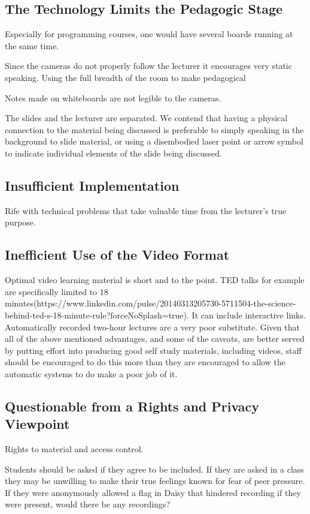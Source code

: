 \documentclass[a4paper,10pt]{article}
\begin{document}
\subsection{The Technology Limits the Pedagogic Stage}
Especially for programming courses, one would have several boards running at the same time.

Since the cameras do not properly follow the lecturer it encourages very static speaking. Using the full breadth of the room to make pedagogical 

Notes made on whiteboards are not legible to the cameras.

The slides and the lecturer are separated. We contend that having a physical connection to the material being discussed is preferable to simply speaking in the background to slide material, or using a disembodied laser point or arrow symbol to indicate individual elements of the slide being discussed. 

\subsection{Insufficient Implementation}
Rife with technical problems that take valuable time from the lecturer's true purpose. 

\subsection{Inefficient Use of the Video Format}
Optimal video learning material is short and to the point. TED talks for example are specifically limited to 18 minutes(https://www.linkedin.com/pulse/20140313205730-5711504-the-science-behind-ted-s-18-minute-rule?forceNoSplash=true). It can include interactive links. Automatically recorded two-hour lectures are a very poor substitute. Given that all of the above mentioned advantages, and some of the caveats, are better served by putting effort into producing good self study materials, including videos, staff should be encouraged to do this more than they are encouraged to allow the automatic systems to do make a poor job of it.

\subsection{Questionable from a Rights and Privacy Viewpoint}
Rights to material and access control.

Students should be asked if they agree to be included. If they are asked in a class they may be unwilling to make their true feelings known for fear of peer pressure. If they were anonymously allowed a flag in Daisy that hindered recording if they were present, would there be any recordings?
\end{document}
